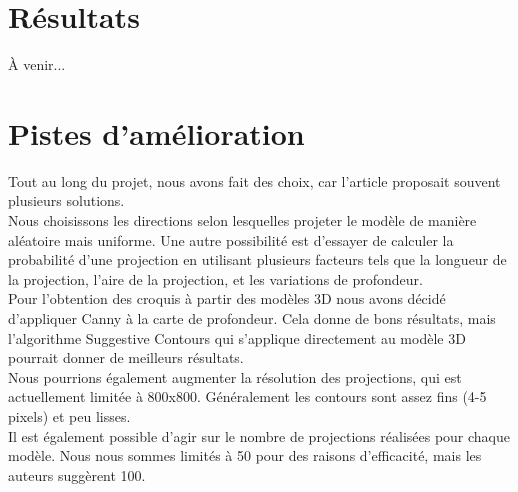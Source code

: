 \documentclass[12pt, a4paper, oneside]{article}
\begin{document}
\section{Résultats}
\label{sec:Résultats}

À venir...

\section{Pistes d'amélioration}
\label{sec:Pistes d'amélioration}

Tout au long du projet, nous avons fait des choix, car l'article proposait souvent plusieurs solutions.\\

Nous choisissons les directions selon lesquelles projeter le modèle de manière aléatoire mais uniforme.
Une autre possibilité est d'essayer de calculer la probabilité d'une projection en utilisant plusieurs facteurs tels que la longueur de la projection, l'aire de la projection, et les variations de profondeur.\\

Pour l'obtention des croquis à partir des modèles 3D nous avons décidé d'appliquer Canny à la carte de profondeur.
Cela donne de bons résultats, mais l'algorithme Suggestive Contours qui s'applique directement au modèle 3D pourrait donner de meilleurs résultats.\\

Nous pourrions également augmenter la résolution des projections, qui est actuellement limitée à 800x800.
Généralement les contours sont assez fins (4-5 pixels) et peu lisses.\\

Il est également possible d'agir sur le nombre de projections réalisées pour chaque modèle.
Nous nous sommes limités à 50 pour des raisons d'efficacité, mais les auteurs suggèrent 100.
\end{document}
